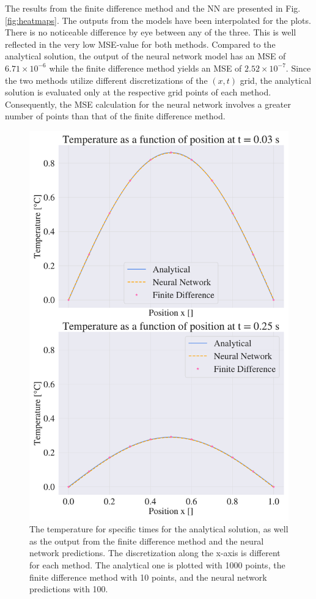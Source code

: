 The results from the finite difference method and the NN are presented in Fig. \ref{fig:heatmaps}.
The outputs from the models have been interpolated for the plots. 
There is no noticeable difference by eye between any of the three.  
This is well reflected in the very low MSE-value for both methods. 
Compared to the analytical solution, the output of the neural network model has an MSE of $ 6.71 \times 10^{-6}$ while the finite difference method yields an MSE of $2.52 \times 10^{-7}$. 
Since the two methods utilize different discretizations of the $(x,t)$ grid, the analytical solution is evaluated only at the respective grid points of each method. 
Consequently, the MSE calculation for the neural network involves a greater number of points than that of the finite difference method.


\begin{figure}[h!]
    \centering
    \includegraphics[width=1.0\linewidth]{project_3/plots/time_slices_comparison.pdf}
    \caption{The temperature for specific times for the analytical solution, as well as the output from the finite difference method and the neural network predictions. The discretization along the x-axis is different for each method. The analytical one is plotted with 1000 points, the finite difference method with 10 points, and the neural network predictions with 100. }
    \label{fig:timeslices}
\end{figure}


